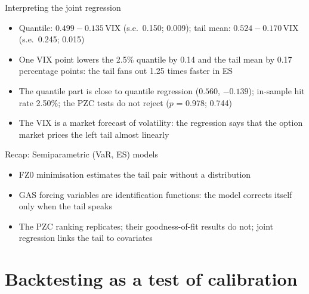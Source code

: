 \begin{frame}{Interpreting the joint regression}
\itemsize{\small}
\begin{itemize}
    \item Quantile: $0.499 \ensuremath{-}0.135\,\mathrm{VIX}$ (s.e.\ 0.150; 0.009); tail mean: $0.524 \ensuremath{-}0.170\,\mathrm{VIX}$ (s.e.\ 0.245; 0.015)
    \item One VIX point lowers the 2.5\% quantile by 0.14 and the tail mean by 0.17 percentage points: the tail fans out 1.25 times faster in ES
    \item The quantile part is close to quantile regression ($0.560$, $\ensuremath{-}0.139$); in-sample hit rate 2.50\%; the PZC tests do not reject ($p$ = 0.978; 0.744)
    \item The VIX is a market forecast of volatility: the regression says that the option market prices the left tail almost linearly
\end{itemize}
\end{frame}

\begin{frame}{Recap: Semiparametric (VaR, ES) models}
\itemsize{\small}
\begin{itemize}
    \item FZ0 minimisation estimates the tail pair without a distribution
    \item GAS forcing variables are identification functions: the model corrects itself only when the tail speaks
    \item The PZC ranking replicates; their goodness-of-fit results do not; joint regression links the tail to covariates
\end{itemize}
\end{frame}


\section{Backtesting as a test of calibration}

